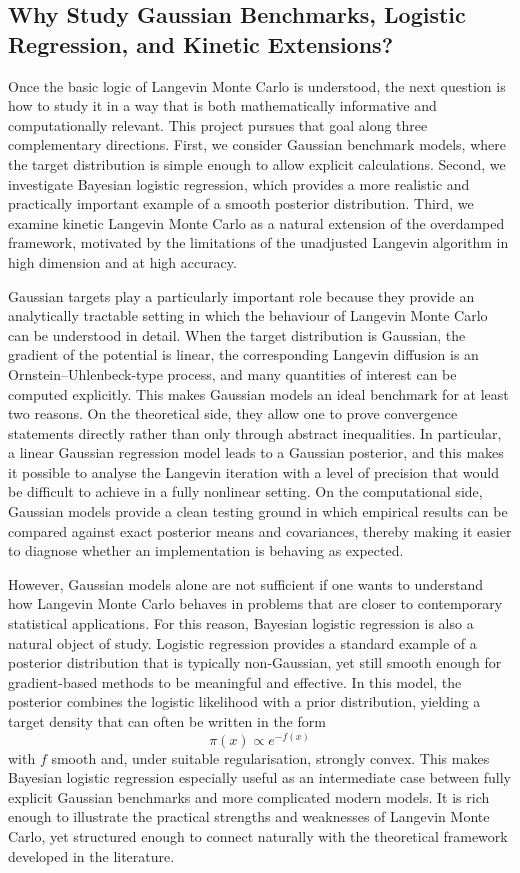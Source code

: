 \documentclass[a4paper,11pt, titlepage]{article}
\theoremstyle{definition}
\theoremstyle{plain}
\theoremstyle{remark}
\begin{document}
\subsection{Why Study Gaussian Benchmarks, Logistic Regression, and Kinetic Extensions?}

Once the basic logic of Langevin Monte Carlo is understood, the next question is how to study it in a way that is both mathematically informative and computationally relevant. This project pursues that goal along three complementary directions. First, we consider Gaussian benchmark models, where the target distribution is simple enough to allow explicit calculations. Second, we investigate Bayesian logistic regression, which provides a more realistic and practically important example of a smooth posterior distribution. Third, we examine kinetic Langevin Monte Carlo as a natural extension of the overdamped framework, motivated by the limitations of the unadjusted Langevin algorithm in high dimension and at high accuracy.

Gaussian targets play a particularly important role because they provide an analytically tractable setting in which the behaviour of Langevin Monte Carlo can be understood in detail. When the target distribution is Gaussian, the gradient of the potential is linear, the corresponding Langevin diffusion is an Ornstein--Uhlenbeck-type process, and many quantities of interest can be computed explicitly. This makes Gaussian models an ideal benchmark for at least two reasons. On the theoretical side, they allow one to prove convergence statements directly rather than only through abstract inequalities. In particular, a linear Gaussian regression model leads to a Gaussian posterior, and this makes it possible to analyse the Langevin iteration with a level of precision that would be difficult to achieve in a fully nonlinear setting. On the computational side, Gaussian models provide a clean testing ground in which empirical results can be compared against exact posterior means and covariances, thereby making it easier to diagnose whether an implementation is behaving as expected.

However, Gaussian models alone are not sufficient if one wants to understand how Langevin Monte Carlo behaves in problems that are closer to contemporary statistical applications. For this reason, Bayesian logistic regression is also a natural object of study. Logistic regression provides a standard example of a posterior distribution that is typically non-Gaussian, yet still smooth enough for gradient-based methods to be meaningful and effective. In this model, the posterior combines the logistic likelihood with a prior distribution, yielding a target density that can often be written in the form
\[
\pi(x)\propto e^{-f(x)}
\]
with $f$ smooth and, under suitable regularisation, strongly convex. This makes Bayesian logistic regression especially useful as an intermediate case between fully explicit Gaussian benchmarks and more complicated modern models. It is rich enough to illustrate the practical strengths and weaknesses of Langevin Monte Carlo, yet structured enough to connect naturally with the theoretical framework developed in the literature.
\end{document}
